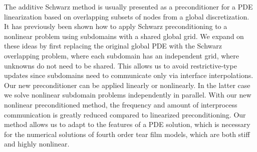 The additive Schwarz method is usually presented as a preconditioner for a PDE linearization based on overlapping subsets of nodes from a global discretization. It has previously been shown how to apply Schwarz preconditioning to a nonlinear problem using subdomains with a shared global grid. We expand on these ideas by first replacing the original global PDE with the Schwarz overlapping problem, where each subdomain has an independent grid, where unknowns do not need to be shared. This allows us to avoid
restrictive-type updates since subdomains need to communicate only via interface interpolations. Our new preconditioner can be applied linearly or nonlinearly. In the latter case we solve nonlinear subdomain problems independently in parallel. With our new nonlinear preconditioned method, the frequency and amount of interprocess communication is greatly reduced compared to linearized preconditioning. Our method allows us to adapt to the features of a PDE solution, which is necessary for the numerical solutions of fourth order tear film models, which are both stiff and highly nonlinear.

